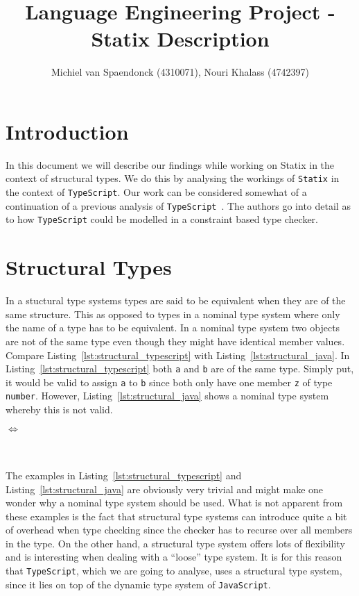 \documentclass{article}
\title{Language Engineering Project - Statix Description}
\author{Michiel van Spaendonck (4310071), Nouri Khalass (4742397)}
\newcommand{\ttt}[1]{\texttt{#1}}
\begin{document}
\maketitle

\section*{Introduction}
In this document we will describe our findings while working on Statix in the context of structural types.
We do this by analysing the workings of \texttt{Statix} in the context of \texttt{TypeScript}.
Our work can be considered somewhat of a continuation of a previous analysis of \texttt{TypeScript}~\cite{MetaTypeScript}.
The authors go into detail as to how \texttt{TypeScript} could be modelled in a constraint based type checker.

\section*{Structural Types}
In a stuctural type systems types are said to be equivalent when they are of the same structure.
This as opposed to types in a nominal type system where only the name of a type has to be equivalent.
In a nominal type system two objects are not of the same type even though they might have identical member values.
Compare Listing~\ref{lst:structural_typescript} with Listing~\ref{lst:structural_java}.
In Listing~\ref{lst:structural_typescript} both \ttt{a} and \ttt{b} are of the same type.
Simply put, it would be valid to assign \ttt{a} to \ttt{b} since both only have one member \ttt{z} of type \ttt{number}.
However, Listing~\ref{lst:structural_java} shows a nominal type system whereby this is not valid.

\noindent
\begin{minipage}{.45\textwidth}

\end{minipage}
\hfill$\Longleftrightarrow$\hfill\hfill\hfill
\begin{minipage}{.45\textwidth}

\end{minipage}
\\\\
The examples in Listing~\ref{lst:structural_typescript} and Listing~\ref{lst:structural_java} are obviously very trivial and might make one wonder why a nominal type system should be used.
What is not apparent from these examples is the fact that structural type systems can introduce quite a bit of overhead when type checking since the checker has to recurse over all members in the type.
On the other hand, a structural type system offers lots of flexibility and is interesting when dealing with a ``loose'' type system.
It is for this reason that \ttt{TypeScript}, which we are going to analyse, uses a structural type system, since it lies on top of the dynamic type system of \ttt{JavaScript}.
\end{document}
